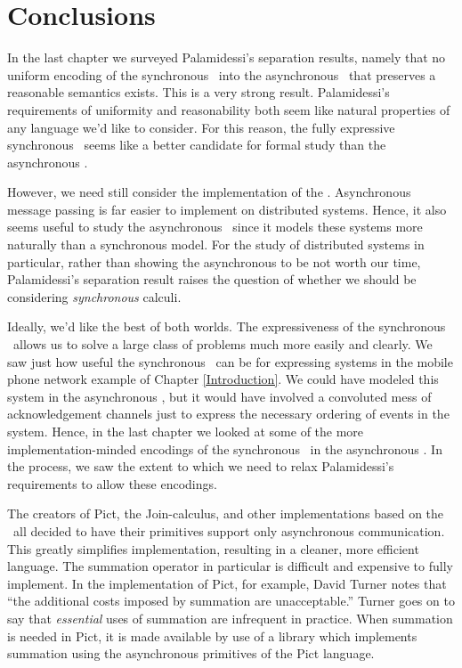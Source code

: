 \chapter{Conclusions}
In the last chapter we surveyed Palamidessi's separation results, namely that no uniform encoding of the synchronous \picalc\ into the asynchronous \picalc\ that preserves a reasonable semantics exists.  
This is a very strong result.
Palamidessi's requirements of uniformity and reasonability both seem like natural properties of any language we'd like to consider.  
For this reason, the fully expressive synchronous \picalc\ seems like a better candidate for formal study than the asynchronous \picalc.

However, we need still consider the implementation of the \picalc.  
Asynchronous message passing is far easier to implement on distributed systems.  
Hence, it also seems useful to study the asynchronous \picalc\ since it models these systems more naturally than a synchronous model.
For the study of distributed systems in particular, rather than showing the asynchronous to be not worth our time, Palamidessi's separation result raises the question of whether we should be considering \emph{synchronous} calculi. 

Ideally, we'd like the best of both worlds.  The expressiveness of the synchronous \picalc\ allows us to solve a large class of problems much more easily and clearly.
We saw just how useful the synchronous \picalc\ can be for expressing systems in the mobile phone network example of Chapter \ref{Introduction}.
We could have modeled this system in the asynchronous \picalc, but it would have involved a convoluted mess of acknowledgement channels just to express the necessary ordering of events in the system.
Hence, in the last chapter we looked at some of the more implementation-minded encodings of the synchronous \picalc\ in the asynchronous \picalc.   
In the process, we saw the extent to which we need to relax Palamidessi's requirements to allow these encodings.

The creators of Pict, the Join-calculus, and other implementations based on the \picalc\ all decided to have their primitives support only asynchronous communication.
This greatly simplifies implementation, resulting in a cleaner, more efficient language.  
The summation operator in particular is difficult and expensive to fully implement.  
In the implementation of Pict, for example, David Turner notes \cite{turn96} that ``the additional costs imposed by summation are unacceptable.''  
Turner goes on to say that \emph{essential} uses of summation are infrequent in practice.
When summation is needed in Pict, it is made available by use of a library which implements summation using the asynchronous primitives of the Pict language.

